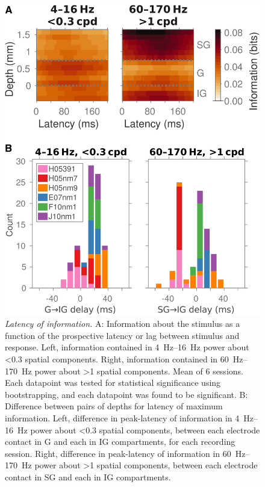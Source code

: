 \begin{figure}
\centering \includegraphics[width=\columnwidth]{paperfigs/figS6}
%
\caption{%
\textit{Latency of information.}
A: Information about the stimulus as a function of the prospective latency or lag between stimulus and response.
Left, information contained in \SIrange{4}{16}{Hz} power about \SI{<0.3}{\cpd} spatial components.
Right, information contained in \SIrange{60}{170}{Hz} power about \SI{>1}{\cpd} spatial components.
Mean of 6 sessions.
Each datapoint was tested for statistical significance using bootstrapping, and each datapoint was found to be significant.
B: Difference between pairs of depths for latency of maximum information.
Left, difference in peak-latency of information in \SIrange{4}{16}{Hz} power about \SI{<0.3}{\cpd} spatial components, between each electrode contact in \ac{G} and each in \ac{IG} compartments, for each recording session.
Right, difference in peak-latency of information in \SIrange{60}{170}{Hz} power about \SI{>1}{\cpd} spatial components, between each electrode contact in \ac{SG} and each in \ac{IG} compartments.
}
\label{fig:lam_s6}
%
\end{figure}


